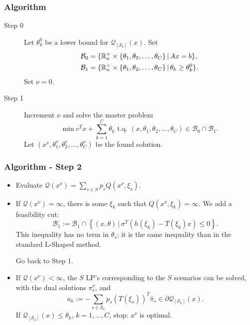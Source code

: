 \documentclass{beamer}
\begin{document}
\begin{frame}
\frametitle{Algorithm}

\begin{description}
\item[Step 0]
Let $\theta_k^0$ be a lower bound for $\mathcal{Q}_{[\mathcal{S}_k]}(x)$.
Set
\begin{align*}
\mathcal{B}_0 &= \lbrace {\mathbb{R}}_n^+ \times \lbrace \theta_1,
\theta_2,\ldots, \theta_C \rbrace \,|\, Ax = b \rbrace, \\
\mathcal{B}_1 &= \lbrace {\mathbb{R}}_n^+ \times \lbrace \theta_1,
\theta_2,\ldots, \theta_C \rbrace \,|\, \theta_k \geq \theta_k^0 \rbrace.
\end{align*}
Set $\nu = 0$.
\item[Step 1]
Increment $\nu$ and solve the {\blue master problem}
\[
\min c^Tx + \sum_{k = 1}^C \theta_k \mbox{ t.q. } (x, \theta_1,
\theta_2,\ldots,  \theta_C) \in \mathcal{B}_0 \cap \mathcal{B}_1.
\]
Let $(x^{\nu}, \theta_1^{\nu}, \theta_2^{\nu},\ldots,
\theta_C^{\nu})$ be the found solution.
\end{description}

\end{frame}

\begin{frame}
\frametitle{Algorithm - Step 2}

\begin{itemize}
\item
Evaluate $\mathcal{Q}(x^{\nu}) = \sum_{s \in S} p_s Q(x^{\nu}, \xi_s)$.
\item
If $\mathcal{Q}(x^{\nu}) = \infty$, there is some $\xi_k$ such that $Q(x^{\nu}, \xi_k) = \infty$.
We add a {\red feasibility cut}:
\[
\mathcal{B}_1 := \mathcal{B}_1 \cap \left\lbrace (x, \theta) \,|\,
\sigma^T(h(\xi_k)-T(\xi_k)x) \leq 0 \right\rbrace.
\]
This inequality has no term in $\theta_s$; it is the same inequality than in the standard L-Shaped method.

Go back to Step 1.
\item
If $\mathcal{Q}(x^{\nu}) < \infty$, the $S$ LP's corresponding to the $S$ scenarios can be solved, with the dual solutions $\pi_s^{\nu}$, and
\[
u_k := -\sum_{s \in \mathcal{S}_k} p_s(T(\xi_s))^T\hat{\pi}_s
\in \partial \mathcal{Q}_{[\mathcal{S}_k]}(x).
\]
If $\mathcal{Q}_{[\mathcal{S}_k]}(x) \leq \theta_k$, $k = 1,\ldots,C$, stop: $x^{\nu}$ is optimal.
\end{itemize}

\end{frame}
\end{document}
